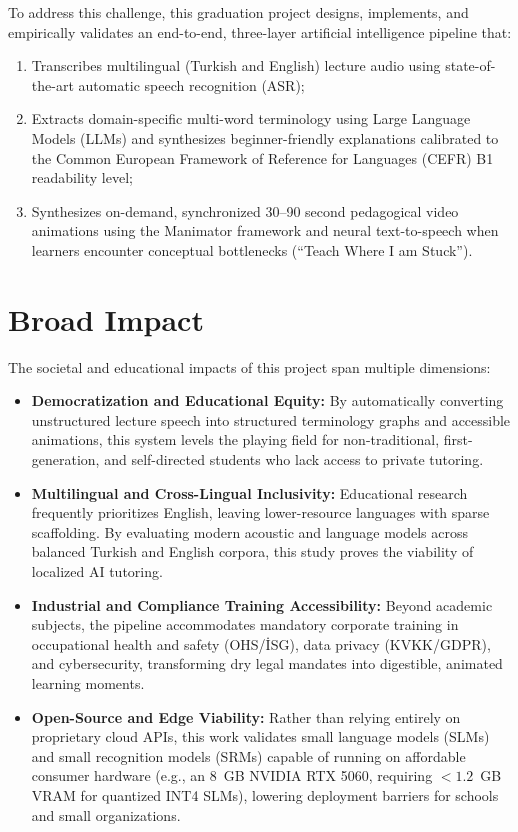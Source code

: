 \documentclass[a4paper,12pt]{report}
\begin{document}
To address this challenge, this graduation project designs, implements, and empirically validates an end-to-end, three-layer artificial intelligence pipeline that:
\begin{enumerate}
    \item Transcribes multilingual (Turkish and English) lecture audio using state-of-the-art automatic speech recognition (ASR);
    \item Extracts domain-specific multi-word terminology using Large Language Models (LLMs) and synthesizes beginner-friendly explanations calibrated to the Common European Framework of Reference for Languages (CEFR) B1 readability level;
    \item Synthesizes on-demand, synchronized 30--90 second pedagogical video animations using the Manimator framework and neural text-to-speech when learners encounter conceptual bottlenecks (``Teach Where I am Stuck'').
\end{enumerate}

\section{Broad Impact}
The societal and educational impacts of this project span multiple dimensions:
\begin{itemize}
    \item \textbf{Democratization and Educational Equity:} By automatically converting unstructured lecture speech into structured terminology graphs and accessible animations, this system levels the playing field for non-traditional, first-generation, and self-directed students who lack access to private tutoring.
    \item \textbf{Multilingual and Cross-Lingual Inclusivity:} Educational research frequently prioritizes English, leaving lower-resource languages with sparse scaffolding. By evaluating modern acoustic and language models across balanced Turkish and English corpora, this study proves the viability of localized AI tutoring.
    \item \textbf{Industrial and Compliance Training Accessibility:} Beyond academic subjects, the pipeline accommodates mandatory corporate training in occupational health and safety (OHS/İSG), data privacy (KVKK/GDPR), and cybersecurity, transforming dry legal mandates into digestible, animated learning moments.
    \item \textbf{Open-Source and Edge Viability:} Rather than relying entirely on proprietary cloud APIs, this work validates small language models (SLMs) and small recognition models (SRMs) capable of running on affordable consumer hardware (e.g., an 8~GB NVIDIA RTX 5060, requiring $<1.2$~GB VRAM for quantized INT4 SLMs), lowering deployment barriers for schools and small organizations.
\end{itemize}
\end{document}
